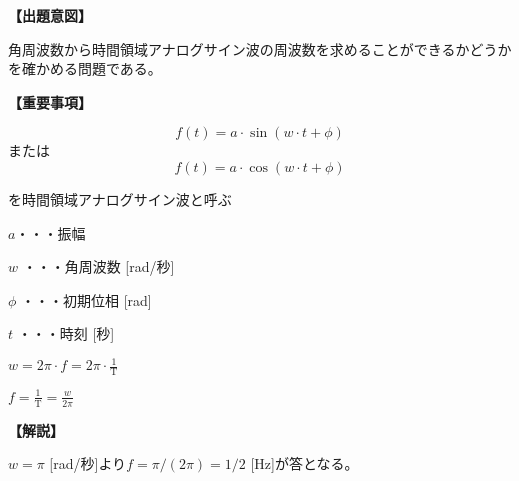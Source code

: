 \noindent \textbf{【出題意図】}

\noindent 角周波数から時間領域アナログサイン波の周波数を求めることができるかどうかを確かめる問題である。

\vspace{1em}
\noindent \textbf{【重要事項】}

\fleqnoff
\[
f(t) = a \cdot \sin( w \cdot t + \phi )
\]
\fleqnon
%
\noindent または
%
\fleqnoff
\[
f(t) = a \cdot \cos( w \cdot t + \phi )
\]
\fleqnon

\medskip
\noindent を時間領域アナログサイン波と呼ぶ

\bigskip
\noindent $a$・・・振幅

\bigskip
\noindent $w$ ・・・角周波数 [rad/秒]

\bigskip
\noindent $\phi$ ・・・初期位相 [rad]

\bigskip
\noindent $t$ ・・・時刻 [秒]

\bigskip
$w = 2\pi \cdot f = 2 \pi \cdot \frac{1}{\textrm{T}}$

\bigskip
$f = \frac{1}{\textrm{T}} = \frac{w}{2\pi}$

\vspace{1em}
\noindent \textbf{【解説】}

\noindent $w = \pi$ [rad/秒]より$f = \pi / (2\pi) = 1/2$ [Hz]が答となる。
